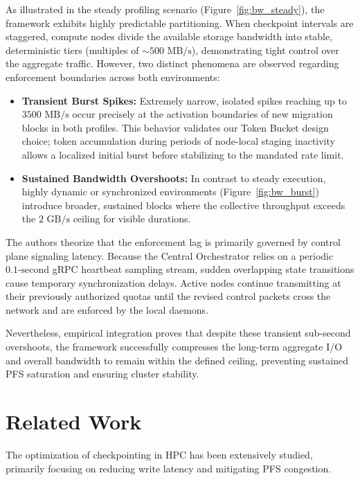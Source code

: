 \documentclass[sigplan,twocolumn,10pt,nonacm]{acmart}
\begin{document}
As illustrated in the steady profiling scenario (Figure~\ref{fig:bw_steady}), the framework exhibits highly predictable partitioning. When checkpoint intervals are staggered, compute
nodes divide the available storage bandwidth into stable, deterministic tiers (multiples of $\sim 500\text{ MB/s}$), demonstrating tight control over the aggregate traffic. However,
two distinct phenomena are observed regarding enforcement boundaries across both environments:

\begin{itemize}
    \item \textbf{Transient Burst Spikes:} Extremely narrow, isolated spikes reaching up to $3500\text{ MB/s}$ occur precisely at the activation boundaries of new migration blocks in
        both profiles. This behavior validates our Token Bucket design choice; token accumulation during periods of node-local staging inactivity allows a localized initial burst before
        stabilizing to the mandated rate limit.
    \item \textbf{Sustained Bandwidth Overshoots:} In contrast to steady execution, highly dynamic or synchronized environments (Figure~\ref{fig:bw_burst}) introduce broader, sustained
        blocks where the collective throughput exceeds the $2\text{ GB/s}$ ceiling for visible durations.
\end{itemize}

The authors theorize that the enforcement lag is primarily governed by control plane signaling latency. Because the Central Orchestrator relies on a periodic $0.1\text{-second}$ gRPC heartbeat
sampling stream, sudden overlapping state transitions cause temporary synchronization delays. Active nodes continue transmitting at their previously authorized quotas until the revised
control packets cross the network and are enforced by the local daemons.

Nevertheless, empirical integration proves that despite these transient sub-second overshoots, the framework successfully compresses the long-term aggregate I/O and overall bandwidth to remain
within the defined ceiling, preventing sustained PFS saturation and ensuring cluster stability.

\section{Related Work}

The optimization of checkpointing in HPC has been extensively studied, primarily focusing on reducing write
latency and mitigating PFS congestion.
\end{document}
